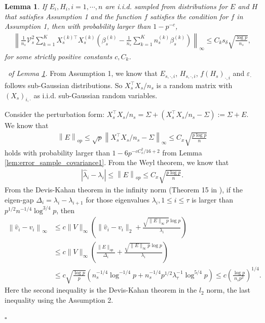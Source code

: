 \documentclass[12pt]{article}
\newtheorem{lemma}{Lemma}
\newenvironment{pf}{{\noindent \it Proof}\ }{\hfill $\square$\par}
\begin{document}
\begin{lemma}
    \label{lem:trimed_sample_covariance}
    If $E_i,H_i,i=1,\cdots,n$ are i.i.d. sampled from distributions for $E$ and $H$ that satisfies Assumption 1 and the function $f$ satisfies the condition for $f$ in Assumption 1, then with probability larger than $1 -  p^{-c}$,
    \begin{align*}
        \left\|\frac{1}{n_s}\mathcal{V}^2_s \sum_{k=1}^K X_s^{(k)\top}X_s^{(k)}\left(\beta_s^{(k)}-\frac{1}{n_s}\sum_{k=1}^K n_s^{(k)}\beta_s^{(k)}\right)\right\|_{\infty} \le  C_ks_\delta \sqrt{\frac{\log p}{n_s}},
    \end{align*}
    for some strictly positive constants $c,C_k$. 
\end{lemma}
\begin{pf}{\it of Lemma \ref{lem:trimed_sample_covariance}. }
From Assumption 1, we know that $E_{s,\cdot,i}$, $H_{s,\cdot,i}$, $f(H_s)_{\cdot,i}$ and $\varepsilon_{\cdot}$ follows sub-Gaussian distributions. So $X_s^\top X_s/n_s$ is a random matrix with $(X_{s})_{i,\cdot}$ as i.i.d. sub-Gaussian random variables. 

Consider the perturbation form: $X_s^\top X_s/n_s = \Sigma + \left(X_s^\top X_s/n_s - \Sigma\right):=\Sigma + E$. We know that 
\begin{align*}
    \left\|E\right\|_{op} \le \sqrt{p}\left\|X_s^\top X_s/n_s - \Sigma\right\|_{\infty} \le C_x\sqrt{\frac{p\log p}{n}}
\end{align*}
holds with probability larger than $1-6p^{-c C_x^2/16 +2}$ from Lemma \ref{lem:error_sample_covariance1}. From the Weyl theorem, we know that 
\begin{align*}
    \left|\hat{\lambda}_i - \lambda_i\right| \le \left\|E\right\|_{op} \le C_x\sqrt{\frac{p\log p }{n}}. 
\end{align*}
From the Devis-Kahan theorem in the infinity norm (Theorem 15 in \cite{bhardwaj2024matrix}), if the eigen-gap $\Delta_i = \lambda_i -\lambda_{i+1}$ for those eigenvalues $\lambda_i,1\le i\le \tau$ is larger than $p^{1/2}n^{-1/4}\log^{3/4} p$, then 
\begin{align*}
    \left\|\hat{v}_i - v_i\right\|_{\infty} &\le c\|V\|_{\infty}\left(\|\hat{v}_i - v_i\|_{2} + \frac{\sqrt{\|E\|_{\infty} p}\log p}{\lambda_i}\right)\\& \le c \|V\|_{\infty}\left(\frac{\|E\|_{op}}{\Delta_i}+\frac{\sqrt{\|E\|_{\infty} p}\log p}{\lambda_i}\right)\\& \le 
    c\sqrt{\frac{\log p}{p}} \left(n_s^{-1/4}\log^{-1/4} p +n_s^{-1/4} p^{1/2}\lambda_\tau^{-1} \log^{5/4} p\right) \le c\left(\frac{\log p}{n_sp^2}\right)^{1/4}. 
\end{align*}
Here the second inequality is the Devis-Kahan theorem in the $l_2$ norm, the last inequality using the Assumption 2. 


\end{pf}
\end{document}
